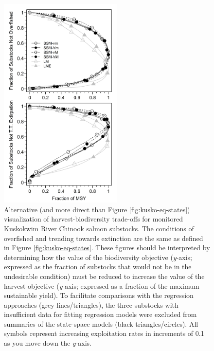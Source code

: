 \documentclass[12pt,]{book}
\theoremstyle{definition}
\theoremstyle{definition}
\theoremstyle{definition}
\theoremstyle{remark}
\begin{document}
\begin{figure}
  \centering
  \includegraphics[width=0.55\textwidth]{img/Ch4/kusko-trade-offs.jpg}
  \caption{Alternative (and more direct than Figure \ref{fig:kusko-eq-states}) visualization of harvest-biodiversity trade-offs for monitored Kuskokwim River Chinook salmon substocks. The conditions of overfished and trending towards extinction are the same as defined in Figure \ref{fig:kusko-eq-states}. These figures should be interpreted by determining how the value of the biodiversity objective (\textit{y}-axis; expressed as the fraction of substocks that would not be in the undesirable condition) must be reduced to increase the value of the harvest objective (\textit{y}-axis; expressed as a fraction of the maximum sustainable yield). To facilitate comparisons with the regression approaches (grey lines/triangles), the three substocks with insufficient data for fitting regression models were excluded from summaries of the state-space models (black triangles/circles). All symbols represent increasing exploitation rates in increments of 0.1 as you move down the \textit{y}-axis.}
  \label{fig:kusko-trade-offs}
\end{figure}

\clearpage
\end{document}
